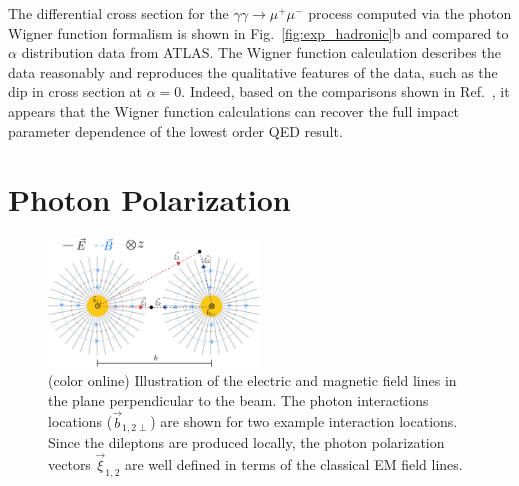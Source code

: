 \documentclass[12pt,epjc3]{svjour3}\sloppy
\begin{document}
The differential cross section for the $\gamma\gamma \rightarrow \mu^+\mu^-$ process computed via the photon Wigner function formalism is shown in Fig.~\ref{fig:exp_hadronic}b and compared to $\alpha$ distribution data from ATLAS. The Wigner function calculation describes the data reasonably and reproduces the qualitative features of the data, such as the dip in cross section at $\alpha=0$. Indeed, based on the comparisons shown in Ref.~\cite{klusek-gawendaCentralityDependenceDilepton2021,Wang:2021kxm}, it appears that the Wigner function calculations can recover the full impact parameter dependence of the lowest order QED result. 

\section{Photon Polarization}
\label{sec:polarization}

\begin{figure}
    \centering
    \includegraphics[width=0.5\textwidth]{fig/photonphoton_polarization_wide-crop.pdf}
    \caption{ (color online) Illustration of the electric and magnetic field lines in the plane perpendicular to the beam. The photon interactions locations ($\vec{b}_{1,2\perp}$) are shown for two example interaction locations. Since the dileptons are produced locally, the photon polarization vectors $\vec{\xi}_{1,2}$ are well defined in terms of the classical EM field lines. }
    \label{fig:illustration}
\end{figure}
\end{document}
